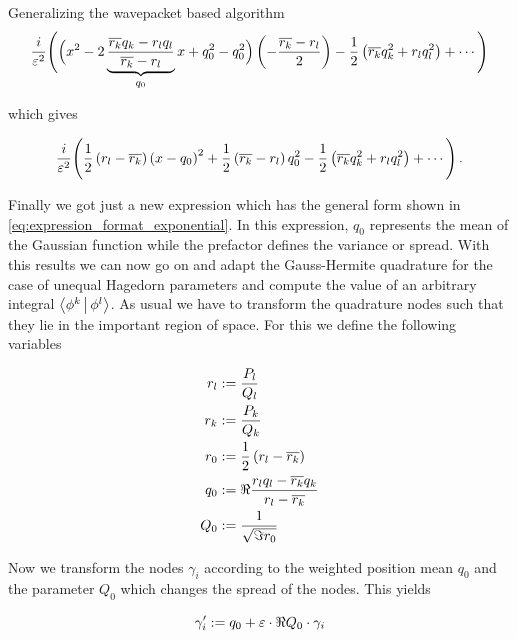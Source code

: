 \begin{chapter}{Generalizing the wavepacket based algorithm}
\begin{equation}
  \frac{i}{\varepsilon^2} \Biggl( \Bigl(x^2 - 2 \underbrace{\frac{\overline{r_k}q_k-r_l q_l}{\overline{r_k}-r_l}}_{q_0} x + q_0^2 - q_0^2\Bigr)
                                 \left(-\frac{\overline{r_k}-r_l}{2}\right)
                                 - \frac{1}{2}\left(\overline{r_k}q_k^2 + r_l q_l^2\right)
                                 + \cdots
                          \Biggr)
\end{equation}

which gives

\begin{equation}
  \frac{i}{\varepsilon^2} \Biggl( \frac{1}{2}\left(r_l-\overline{r_k}\right) \left(x-q_0\right)^2
                                 + \frac{1}{2}\left(\overline{r_k}-r_l\right) q_0^2
                                 - \frac{1}{2}\left(\overline{r_k}q_k^2 + r_l q_l^2\right)
                                 + \cdots
                          \Biggr) \,.
\end{equation}

Finally we got just a new expression which has the general form shown in \eqref{eq:expression_format_exponential}.
In this expression, $q_0$ represents the mean of the Gaussian function while the
prefactor defines the variance or spread. With this results we can now go on and
adapt the Gauss-Hermite quadrature for the case of unequal Hagedorn parameters
and compute the value of an arbitrary integral $\Braket{ \phi^k | \phi^l }$. As
usual we have to transform the quadrature nodes such that they lie in the important
region of space. For this we define the following variables

\begin{equation}
\begin{split}
  r_l & := \frac{P_l}{Q_l} \\
  r_k & := \frac{P_k}{Q_k} \\
  r_0 & := \frac{1}{2} \left(r_l - \overline{r_k}\right) \\
  q_0 & := \Re \frac{r_l q_l - \overline{r_k} q_k}{r_l - \overline{r_k}} \\
  Q_0 & := \frac{1}{\sqrt{\Im r_0}}
\end{split}
\end{equation}

Now we transform the nodes $\gamma_i$ according to the weighted position mean $q_0$
and the parameter $Q_0$ which changes the spread of the nodes. This yields

\begin{equation}
  \gamma^{\prime}_i := q_0 + \varepsilon \cdot \Re Q_0 \cdot \gamma_i
\end{equation}


\end{chapter}
